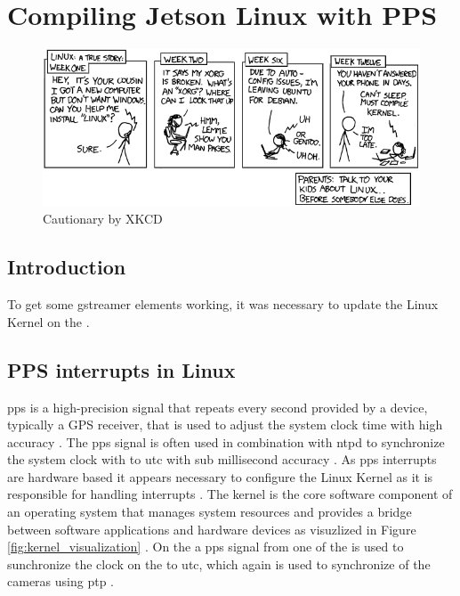 

\chapter{Compiling Jetson Linux with PPS}
\label{chap:flashing_xavier}
\begin{figure}[H]
    \centering
    \includegraphics[width=\textwidth]{figures/cautionary.png}
    \caption{Cautionary by XKCD \cite{xkcdCautionary2008}}
    \label{fig:xkcd_cautionary}
\end{figure}

\section{Introduction}
To get some \gls{gstreamer} elements working, it was necessary to update the Linux Kernel on the \jx \cite{martensProblemsNvvidconvVideo2023}.


\section{PPS interrupts in Linux}
\gls{pps} is a high-precision signal that repeats every second provided by a device, typically a GPS receiver, that is used to adjust the system clock time with high accuracy \cite{giomettiLinuxPPSWikiLinuxPPS2007}.
The \gls{pps} signal is often used in combination with \gls{ntpd} to synchronize the system clock with to \gls{utc} with sub millisecond accuracy \cite{giomettiLinuxPPSWikiLinuxPPS2007}.
As \gls{pps} interrupts are hardware based it appears necessary to configure the Linux Kernel as it is responsible for handling interrupts \cite{giomettiLinuxPPSWikiLinuxPPS2007}.
The kernel is the core software component of an operating system that manages system resources and provides a bridge between software applications and hardware devices as visuzlized in Figure \ref{fig:kernel_visualization} \cite{thekerneldevelopmentcommunityInterruptsLinuxKernel}.
On the \sr a \gls{pps} signal from one of the  is used to sunchronize the clock on the \jx to \gls{utc}, which again is used to synchronize of the cameras using \gls{ptp} \cite{martensPortableSensorRig2022}.


